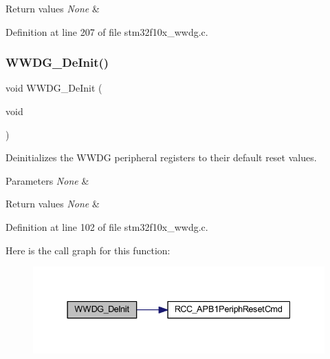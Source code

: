 \begin{DoxyRetVals}{Return values}
{\em None} & \\
\hline
\end{DoxyRetVals}


Definition at line 207 of file stm32f10x\+\_\+wwdg.\+c.

\mbox{\label{group___w_w_d_g___exported___functions_ga7130f4dc861b9234b62e73f9f57f89a1}} 
\subsubsection{\texorpdfstring{W\+W\+D\+G\+\_\+\+De\+Init()}{WWDG\_DeInit()}}
{\footnotesize\ttfamily void W\+W\+D\+G\+\_\+\+De\+Init (\begin{DoxyParamCaption}\item[{void}]{ }\end{DoxyParamCaption})}



Deinitializes the W\+W\+DG peripheral registers to their default reset values. 


\begin{DoxyParams}{Parameters}
{\em None} & \\
\hline
\end{DoxyParams}

\begin{DoxyRetVals}{Return values}
{\em None} & \\
\hline
\end{DoxyRetVals}


Definition at line 102 of file stm32f10x\+\_\+wwdg.\+c.

Here is the call graph for this function\+:
\nopagebreak
\begin{figure}[H]
\begin{center}
\leavevmode
\includegraphics[width=337pt]{group___w_w_d_g___exported___functions_ga7130f4dc861b9234b62e73f9f57f89a1_cgraph}
\end{center}
\end{figure}
\mbox{\label{group___w_w_d_g___exported___functions_ga10dc2554d0b504b5472e3ecf0f02a9e6}} 
